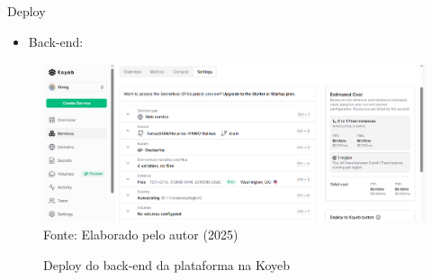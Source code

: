 \begin{frame}{Deploy}
    \begin{itemize}
        \item Back-end:
    \end{itemize}
    \begin{figure}
        \centering
        \vspace{-0.3cm}
        \caption{Deploy do back-end da plataforma na Koyeb}
        \vspace{-0.2cm}
        \includegraphics[width=1\textwidth]{figuras/deploy-2.png}
        \\ %
        \small Fonte: Elaborado pelo autor (2025)
    \end{figure}
\end{frame}

